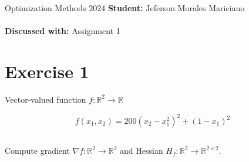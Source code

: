 \documentclass[unicode,11pt,a4paper,oneside,numbers=endperiod,openany]{scrartcl}
\begin{document}
\setassignment
{}

\serieheader
{Optimization Methods}
{2024}
{\textbf{Student:} Jeferson Morales Mariciano \\\\}
{\textbf{Discussed with:} }
{Assignment 1}{}
\newline



\section{Exercise 1}
Vector-valued function $f : \mathbb{R}^2 \rightarrow \mathbb{R}$

\begin{equation}
    f(x_1, x_2) = 200 (x_2 - x_1^2)^2 + (1 - x_1)^2
\end{equation}

\subsection{}
Compute gradient $\nabla f : \mathbb{R}^2 \rightarrow \mathbb{R}^2$
and Hessian $H_f : \mathbb{R}^2 \rightarrow \mathbb{R}^{2 \times 2}$. \newline
\end{document}

